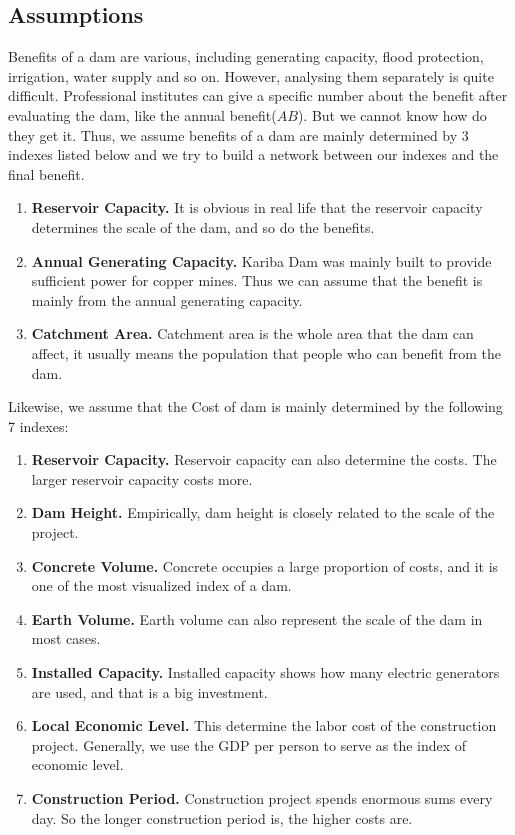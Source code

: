 \documentclass[12pt]{article}%
\begin{document}
\subsection{Assumptions}
Benefits of a dam are various, including generating capacity, flood protection, irrigation, water supply and so on. However, analysing them separately is quite difficult. Professional institutes can give a specific number about the benefit after evaluating the dam, like the annual benefit($AB$). But we cannot know how do they get it. Thus, we assume benefits of a dam are mainly determined by 3 indexes listed below and we try to build a network between our indexes and the final benefit.
\begin{enumerate}[1.]
	\item \textbf{Reservoir Capacity.} It is obvious in real life that the reservoir capacity determines the scale of the dam, and so do the benefits.
	\item \textbf{Annual Generating Capacity.} Kariba Dam was mainly built to provide sufficient power for copper mines. Thus we can assume that the benefit is mainly from the annual generating capacity.
	\item \textbf{Catchment Area.} Catchment area is the whole area that the dam can affect, it usually means the population that people who can benefit from the dam.
\end{enumerate}
Likewise, we assume that the Cost of dam is mainly determined by the following 7 indexes:
\begin{enumerate}[1.]
	\item \textbf{Reservoir Capacity.} Reservoir capacity can also determine the costs. The larger reservoir capacity costs more.
	\item \textbf{Dam Height.} Empirically, dam height is closely related to the scale of the project.
	\item \textbf{Concrete Volume.} Concrete occupies a large proportion of costs, and it is one of the most visualized index of a dam.
	\item \textbf{Earth Volume.} Earth volume can also represent the scale of the dam in most cases.
	\item \textbf{Installed Capacity.} Installed capacity shows how many electric generators are used, and that is a big investment.
	\item \textbf{Local Economic Level.} This determine the labor cost of the construction project. Generally, we use the GDP per person to serve as the index of economic level.
	\item \textbf{Construction Period.} Construction project spends enormous sums every day. So the longer construction period is, the higher costs are.
\end{enumerate}
\end{document}
